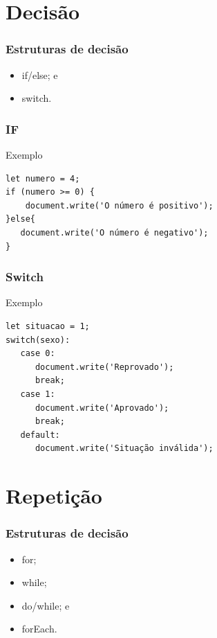 \documentclass[aspectratio=169]{beamer} %
\begin{document}
\section{Decisão}

\begin{frame}
	\frametitle{Estruturas de decisão}
	
	\begin{itemize}
		\item if/else; e
		\item switch.
	\end{itemize}	
\end{frame}

\begin{frame}[fragile]
	\frametitle{IF}
	
	\begin{exampleblock}{Exemplo}
		\begin{lstlisting}
let numero = 4;
if (numero >= 0) {
	document.write('O número é positivo');
}else{
   document.write('O número é negativo');
}
		\end{lstlisting}
	\end{exampleblock}
\end{frame}

\begin{frame}[fragile]
	\frametitle{Switch}
	
	\begin{exampleblock}{Exemplo}
		\begin{lstlisting}
let situacao = 1;
switch(sexo):
   case 0:
      document.write('Reprovado');
      break;
   case 1:
      document.write('Aprovado');
      break;
   default:
      document.write('Situação inválida');
		\end{lstlisting}
	\end{exampleblock}
\end{frame}

\section{Repetição}

\begin{frame}
	\frametitle{Estruturas de decisão}
	
	\begin{itemize}
		\item for;
		\item while;
		\item do/while; e
		\item forEach.
	\end{itemize}	
\end{frame}
\end{document}
